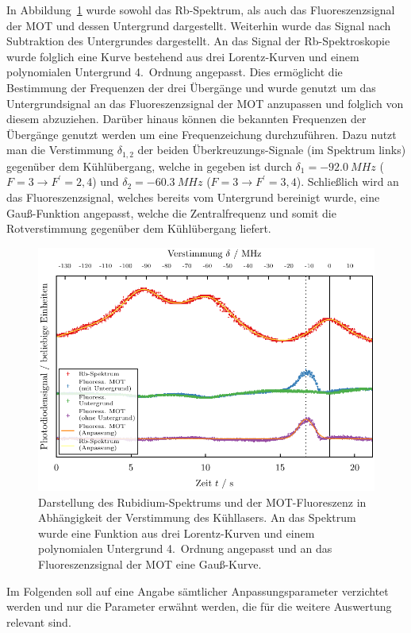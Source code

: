 \documentclass[11pt, a4paper]{article}
\numberwithin{equation}{section}
\begin{document}
In Abbildung~\ref{fig:detuning_cooling} wurde sowohl das Rb-Spektrum, als auch das Fluoreszenzsignal der MOT und dessen Untergrund dargestellt.
Weiterhin wurde das Signal nach Subtraktion des Untergrundes dargestellt.
An das Signal der Rb-Spektroskopie wurde folglich eine Kurve bestehend aus drei Lorentz-Kurven und einem polynomialen Untergrund 4.\ Ordnung angepasst.
Dies ermöglicht die Bestimmung der Frequenzen der drei Übergänge und wurde genutzt um das Untergrundsignal an das Fluoreszenzsignal der MOT anzupassen und folglich von diesem abzuziehen.
Darüber hinaus können die bekannten Frequenzen der Übergänge genutzt werden um eine Frequenzeichung durchzuführen.
Dazu nutzt man die Verstimmung $\delta_{1,2}$ der beiden Überkreuzungs-Signale (im Spektrum links) gegenüber dem Kühlübergang, welche in \cite{script} gegeben ist durch $\delta_1 = \SI{-92.0}{MHz}$ ($F=3 \rightarrow F^\prime=2,4$) und $\delta_2 = \SI{-60.3}{MHz}$ ($F=3 \rightarrow F^\prime=3,4$).
Schließlich wird an das Fluoreszenzsignal, welches bereits vom Untergrund bereinigt wurde, eine Gauß-Funktion angepasst, welche die Zentralfrequenz und somit die Rotverstimmung gegenüber dem Kühlübergang liefert.
\begin{figure}[h]
	\centering
	\includegraphics{./figures/detuning_cooling.pdf}
	\caption{Darstellung des Rubidium-Spektrums und der MOT-Fluoreszenz in Abhängigkeit der Verstimmung des Kühllasers. An das Spektrum wurde eine Funktion aus drei Lorentz-Kurven und einem polynomialen Untergrund 4.\ Ordnung angepasst und an das Fluoreszenzsignal der MOT eine Gauß-Kurve.}
	\label{fig:detuning_cooling}
\end{figure}
Im Folgenden soll auf eine Angabe sämtlicher Anpassungsparameter verzichtet werden und nur die Parameter erwähnt werden, die für die weitere Auswertung relevant sind.
\end{document}

